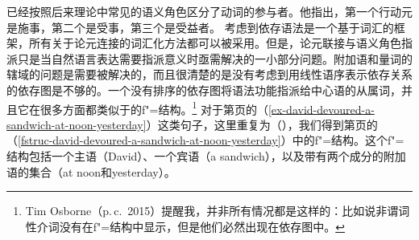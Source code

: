 \tes 已经按照后来理论中常见的语义角色区分了动词的参与者。他指出，第一个行动元是施事，第二个是受事，第三个是受益者\citep[\S~106]{Tesniere2015a-not-crossreferenced}。
考虑到依存语法是一个基于词汇的框架，所有关于论元连接的词汇化方法都可以被采用。但是，论元联接与语义角色指派只是当自然语言表达需要指派意义时亟需解决的一小部分问题。附加语和量词的辖域的问题是需要被解决的，而且很清楚的是没有考虑到用线性语序表示依存关系的依存图是不够的。一个没有排序的依存图将语法功能指派给中心语的从属词，并且它在很多方面都类似于\lfgc 的f"=结构。\footnote{%
Tim Osborne（p.\,c.\ 2015）提醒我，并非所有情况都是这样的：比如说非谓词性介词没有在f"=结构中显示，但是他们必然出现在依存图中。
} 对于第\pageref{ex-david-devoured-a-sandwich-at-noon-yesterday}页的（\ref{ex-david-devoured-a-sandwich-at-noon-yesterday}）这类句子，这里重复为（），我们得到第\pageref{fstruc-david-devoured-a-sandwich-at-noon-yesterday}页的（\ref{fstruc-david-devoured-a-sandwich-at-noon-yesterday}）中的f"=结构。这个f"=结构包括一个主语（David）、一个宾语（a sandwich），以及带有两个成分的附加语的集合（at noon和yesterday）。
